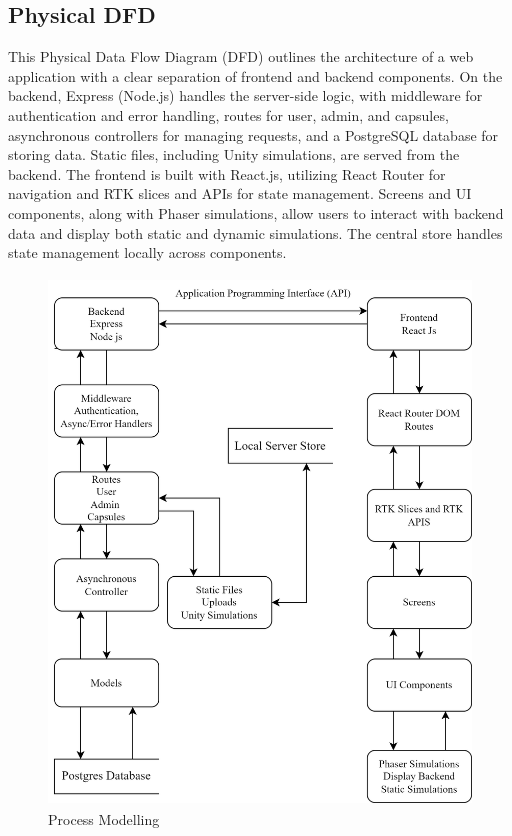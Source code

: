\subsection{Physical DFD}
This Physical Data Flow Diagram (DFD) outlines the architecture of a web application with a clear separation of frontend and backend components. On the backend, Express (Node.js) handles the server-side logic, with middleware for authentication and error handling, routes for user, admin, and capsules, asynchronous controllers for managing requests, and a PostgreSQL database for storing data. Static files, including Unity simulations, are served from the backend. The frontend is built with React.js, utilizing React Router for navigation and RTK slices and APIs for state management. Screens and UI components, along with Phaser simulations, allow users to interact with backend data and display both static and dynamic simulations. The central store handles state management locally across components.
\begin{figure}[H]
    \centering
    \includegraphics[height = 14cm]{Diagrams/DFD Process Modeling.png}
    \caption{Process Modelling}
\end{figure}

